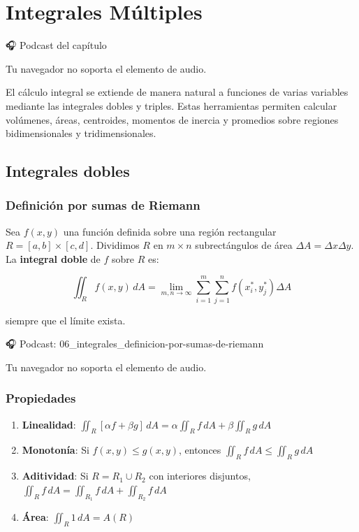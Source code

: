 \documentclass[
]{book}
\providecommand{\tightlist}{%
  \setlength{\itemsep}{0pt}\setlength{\parskip}{0pt}}
\begin{document}
\chapter{Integrales Múltiples}\label{integrales}

🎧 Podcast del capítulo

Tu navegador no soporta el elemento de audio.

El cálculo integral se extiende de manera natural a funciones de varias variables mediante las integrales dobles y triples. Estas herramientas permiten calcular volúmenes, áreas, centroides, momentos de inercia y promedios sobre regiones bidimensionales y tridimensionales.

\section{Integrales dobles}\label{integrales-dobles}

\subsection{Definición por sumas de Riemann}\label{definiciuxf3n-por-sumas-de-riemann}

Sea \(f(x, y)\) una función definida sobre una región rectangular \(R = [a, b] \times [c, d]\). Dividimos \(R\) en \(m \times n\) subrectángulos de área \(\Delta A = \Delta x \Delta y\). La \textbf{integral doble} de \(f\) sobre \(R\) es:

\[
\iint_R f(x, y) \, dA = \lim_{m,n \to \infty} \sum_{i=1}^m \sum_{j=1}^n f(x_i^*, y_j^*) \Delta A
\]

siempre que el límite exista.

🎧 Podcast: 06\_integrales\_definicion-por-sumas-de-riemann

Tu navegador no soporta el elemento de audio.

\subsection{Propiedades}\label{propiedades-1}

\begin{enumerate}
\def\labelenumi{\arabic{enumi}.}
\tightlist
\item
  \textbf{Linealidad}: \(\iint_R [\alpha f + \beta g] \, dA = \alpha \iint_R f \, dA + \beta \iint_R g \, dA\)
\item
  \textbf{Monotonía}: Si \(f(x, y) \leq g(x, y)\), entonces \(\iint_R f \, dA \leq \iint_R g \, dA\)
\item
  \textbf{Aditividad}: Si \(R = R_1 \cup R_2\) con interiores disjuntos, \(\iint_R f \, dA = \iint_{R_1} f \, dA + \iint_{R_2} f \, dA\)
\item
  \textbf{Área}: \(\iint_R 1 \, dA = A(R)\)
\end{enumerate}
\end{document}
